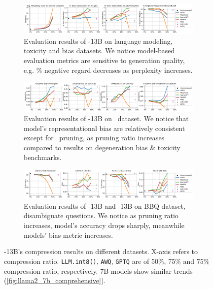 

\begin{figure}[!t]
    \begin{subfigure}{\linewidth}
    \includegraphics[width=\linewidth]{figures/1a.png}
    \caption{Evaluation results of -13B on language modeling, toxicity and bias datasets. We notice model-based evaluation metrics are sensitive to generation quality, e.g. \% negative regard decreases as perplexity increases.}
    \label{subfig:llama2_13b_generative}
    \end{subfigure}

    \begin{subfigure}{\linewidth}
    \includegraphics[width=\linewidth]{figures/1b.png}
    \caption{Evaluation results of -13B on \unqover~dataset. We notice that model's representational bias are relatively consistent except for \gmp~pruning, as pruning ratio increases compared to results on degeneration bias \& toxicity benchmarks.}
    \label{subfig:llama2_13b_unqover}
    \end{subfigure}

    \begin{subfigure}{\linewidth}
    \includegraphics[width=\linewidth]{figures/1c.png}
    \caption{Evaluation results of -13B and -13B on BBQ dataset, disambiguate questions. We notice as pruning ratio increases, model's accuracy drops sharply, meanwhile models' bias metric increases.}
    \label{subfig:llama_tulu_bbq}
    \end{subfigure}
    \caption{-13B's compression results on different datasets. X-axis refers to compression ratio. \texttt{LLM.int8()}, \texttt{AWQ}, \texttt{GPTQ} are of 50\%, 75\% and 75\% compression ratio, respectively. 7B models show similar trends (\cref{fig:llama2_7b_comprehensive}).}
    \label{fig:llama2_13b_comprehensive}
    \vspace{-15pt}
\end{figure}

